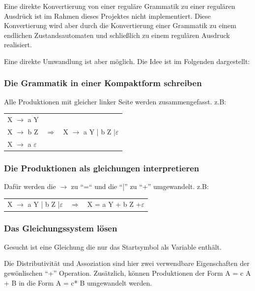 Eine direkte Konvertierung von einer reguläre Grammatik zu einer regulären
Ausdrück ist im Rahmen dieses Projektes nicht implementiert. Diese Konvertierung
wird aber durch die Konvertierung einer Grammatik zu einem endlichen
Zustandsautomaten und schließlich zu einem regulären Ausdruck realisiert.

Eine direkte Umwandlung ist aber möglich. Die Idee ist im Folgenden dargestellt:
\subsubsection*{Die Grammatik in einer Kompaktform schreiben}
Alle Produktionen mit gleicher linker Seite werden zusammengefasst. z.B:

\begin{tabular}{lcr}

X $\rightarrow$ a Y & & \\
X $\rightarrow$ b Z & $\Longrightarrow$ & X $\rightarrow$ a Y | b Z
|$\varepsilon$\\
X $\rightarrow$ a $\varepsilon$ & &\\
 
\end{tabular}

\subsubsection*{Die Produktionen als gleichungen interpretieren}

Dafür werden die $\rightarrow$ zu ``=``  und die ``|'' zu ``+'' umgewandelt.
z.B:

\begin{tabular}{lcr}

X $\rightarrow$ a Y | b Z |$\varepsilon$ & $\Longrightarrow$ & X = a Y + b Z
+$\varepsilon$\\

 
\end{tabular}

\subsubsection*{Das Gleichungssystem lösen}

Gesucht ist eine Gleichung die nur das Startsymbol als Variable enthält.

Die Distributivität und Assoziation sind hier zwei verwendbare Eigenschaften der
gewönlischen ``+'' Operation. Zusätzlich, können Produktionen der Form A = c A +
B in die Form A = c* B umgewandelt werden.


